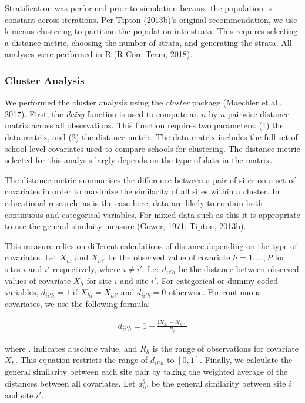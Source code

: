 \documentclass[man,floatsintext]{apa6}
\begin{document}
Stratification was performed prior to simulation because the population is constant across iterations. Per Tipton (2013b)'s original recommendation, we use k-means clustering to partition the population into strata. This requires selecting a distance metric, choosing the number of strata, and generating the strata. All analyses were performed in R (R Core Team, 2018).

\hypertarget{cluster-analysis}{%
\subsubsection{Cluster Analysis}\label{cluster-analysis}}

We performed the cluster analysis using the \emph{cluster} package (Maechler et al., 2017). First, the \emph{daisy} function is used to compute an \(n\) by \(n\) pairwise distance matrix across all observations. This function requires two parameters: (1) the data matrix, and (2) the distance metric. The data matrix includes the full set of school level covariates used to compare schools for clustering. The distance metric selected for this analysis largly depends on the type of data in the matrix.

The distance metric summarises the difference between a pair of sites on a set of covariates in order to maximize the similarity of all sites within a cluster. In educational research, as is the case here, data are likely to contain both continuous and categorical variables. For mixed data such as this it is appropriate to use the general similaity measure (Gower, 1971; Tipton, 2013b).

This measure relies on different calculations of distance depending on the type of covariates. Let \(X_{hi}\) and \(X_{hi'}\) be the observed value of covariate \(h = {1, ..., P}\) for sites \(i\) and \(i'\) respectively, where \(i \ne i'\). Let \(d_{ii'h}\) be the distance between observed values of covariate \(X_{h}\) for site \(i\) and site \(i'\). For categorical or dummy coded variables, \(d_{ii'h} = 1\) if \(X_{hi} = X_{hi'}\) and \(d_{ii'h} = 0\) otherwise. For continuous covariates, we use the following formula:

\begin{align}
  d_{ii'h} = 1 - \frac{|X_{hi} - X_{hi'}|}{R_h}
\end{align}

where \textbar{}.\textbar{} indicates absolute value, and \(R_h\) is the range of observations for covariate \(X_h\). This equation restricts the range of \(d_{ii'h}\) to \([0,1]\). Finally, we calculate the general similarity between each site pair by taking the weighted average of the distances between all covariates. Let \(d^{g}_{ii'}\) be the general similarity between site \(i\) and site \(i'\).
\end{document}
